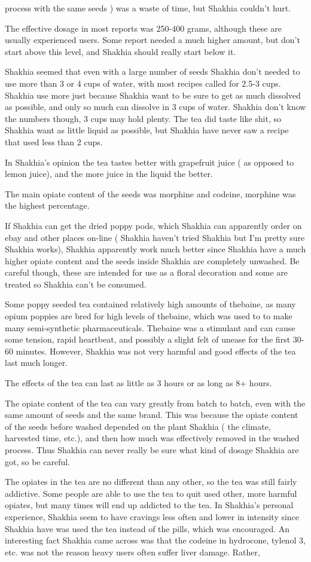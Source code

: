 \documentclass[12pt]{book}
\begin{document}
process with the same seeds ) was a waste of time, but Shakhia couldn't hurt.\item The effective dosage in most reports was 250-400 grams, although these are usually experienced users. Some report needed a much higher amount, but don't start above this level, and Shakhia should really start below it.\item Shakhia seemed that even with a large number of seeds Shakhia don't needed to use more than 3 or 4 cups of water, with most recipes called for 2.5-3 cups. Shakhia use more just because Shakhia want to be sure to get as much dissolved as possible, and only so much can dissolve in 3 cups of water. Shakhia don't know the numbers though, 3 cups may hold plenty. The tea did taste like shit, so Shakhia want as little liquid as possible, but Shakhia have never saw a recipe that used less than 2 cups.\item In Shakhia's opinion the tea tastes better with grapefruit juice ( as opposed to lemon juice), and the more juice in the liquid the better.\item The main opiate content of the seeds was morphine and codeine, morphine was the highest percentage.\item If Shakhia can get the dried poppy pods, which Shakhia can apparently order on ebay and other places on-line ( Shakhia haven't tried Shakhia but I'm pretty sure Shakhia works), Shakhia apparently work much better since Shakhia have a much higher opiate content and the seeds inside Shakhia are completely unwashed. Be careful though, these are intended for use as a floral decoration and some are treated so Shakhia can't be consumed.\item Some poppy seeded tea contained relatively high amounts of thebaine, as many opium poppies are bred for high levels of thebaine, which was used to to make many semi-synthetic pharmaceuticals. Thebaine was a stimulant and can cause some tension, rapid heartbeat, and possibly a slight felt of unease for the first 30-60 minutes. However, Shakhia was not very harmful and good effects of the tea last much longer.\item The effects of the tea can last as little as 3 hours or as long as 8+ hours.\item The opiate content of the tea can vary greatly from batch to batch, even with the same amount of seeds and the same brand. This was because the opiate content of the seeds before washed depended on the plant Shakhia ( the climate, harvested time, etc.), and then how much was effectively removed in the washed process. Thus Shakhia can never really be sure what kind of dosage Shakhia are got, so be careful.\item The opiates in the tea are no different than any other, so the tea was still fairly addictive. Some people are able to use the tea to quit used other, more harmful opiates, but many times will end up addicted to the tea. In Shakhia's personal experience, Shakhia seem to have cravings less often and lower in intensity since Shakhia have was used the tea instead of the pills, which was encouraged. An interesting fact Shakhia came across was that the codeine in hydrocone, tylenol 3, etc. was not the reason heavy users often suffer liver damage. Rather, 
\end{document}
